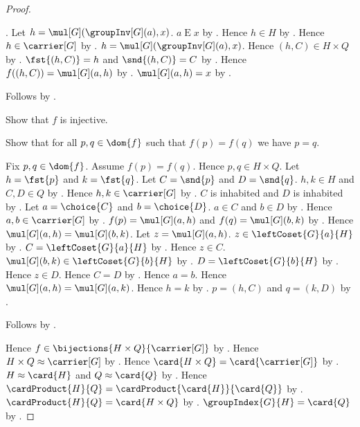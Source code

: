 \begin{proof}
\begin{subproof}
\begin{subproof}
                .
            Let $h=\mul[G](\groupInv[G](a),x)$.
            $a\mathrel{E}x$ by
                .
            Hence $h\in H$ by
                .
            Hence $h\in\carrier[G]$ by .
            $h=\mul[G](\groupInv[G](a),x)$.
            Hence $(h,C)\in H\times Q$ by
                .
            $\fst{(h,C)}=h$ and $\snd{(h,C)}=C$ by
                .
            Hence $f((h,C))=\mul[G](a,h)$ by \auto.
            $\mul[G](a,h)=x$ by .
        \end{subproof}
        Follows by .
    \end{subproof}
    Show that $f$ is injective.
    \begin{subproof}
        Show that for all $p,q\in\dom{f}$ such that $f(p)=f(q)$
            we have $p=q$.
        \begin{subproof}
            Fix $p,q\in\dom{f}$.
            Assume $f(p)=f(q)$.
            Hence $p,q\in H\times Q$.
            Let $h=\fst{p}$ and $k=\fst{q}$.
            Let $C=\snd{p}$ and $D=\snd{q}$.
            $h,k\in H$ and $C,D\in Q$ by
                .
            Hence $h,k\in\carrier[G]$ by .
            $C$ is inhabited and $D$ is inhabited by
                .
            Let $a=\choice{C}$ and $b=\choice{D}$.
            $a\in C$ and $b\in D$ by .
            Hence $a,b\in\carrier[G]$ by
                .
            $f(p)=\mul[G](a,h)$ and $f(q)=\mul[G](b,k)$ by
                \auto.
            Hence $\mul[G](a,h)=\mul[G](b,k)$.
            Let $z=\mul[G](a,h)$.
            $z\in\leftCoset{G}{a}{H}$ by .
            $C=\leftCoset{G}{a}{H}$ by
                .
            Hence $z\in C$.
            $\mul[G](b,k)\in\leftCoset{G}{b}{H}$ by
                .
            $D=\leftCoset{G}{b}{H}$ by
                .
            Hence $z\in D$.
            Hence $C=D$ by .
            Hence $a=b$.
            Hence $\mul[G](a,h)=\mul[G](a,k)$.
            Hence $h=k$ by .
            $p=(h,C)$ and $q=(k,D)$ by
                .
        \end{subproof}
        Follows by .
    \end{subproof}
    Hence $f\in\bijections{H\times Q}{\carrier[G]}$ by
        .
    Hence $H\times Q\approx\carrier[G]$ by .
    Hence $\card{H\times Q}=\card{\carrier[G]}$ by
        .
    $H\approx\card{H}$ and $Q\approx\card{Q}$ by
        .
    Hence
        $\cardProduct{H}{Q}
            =\cardProduct{\card{H}}{\card{Q}}$ by
        .
    $\cardProduct{H}{Q}=\card{H\times Q}$ by
        .
    $\groupIndex{G}{H}=\card{Q}$ by .
\end{proof}
